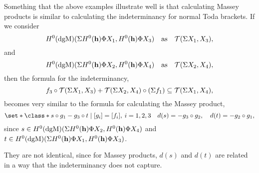 Something that the above examples illustrate well is that calculating Massey products is similar to calculating the indeterminancy for normal Toda brackets. If we consider
\[
    H^0(\operatorname{dgM})(\Sigma H^0(\mathbf{h}) \Phi X_1, H^0(\mathbf{h}) \Phi X_3) \quad \text{as} \quad {\mathcal{T}}(\Sigma X_1, X_3),
\]
and
\[
    H^0(\operatorname{dgM})(\Sigma H^0(\mathbf{h}) \Phi X_2, H^0(\mathbf{h}) \Phi X_4) \quad \text{as} \quad {\mathcal{T}}(\Sigma X_2, X_4),
\]
then the formula for the indeterminancy,
\[
    f_3 \circ {\mathcal{T}}(\Sigma X_1, X_3)  + {\mathcal{T}}(\Sigma X_2, X_4) \circ (\Sigma f_1) \subseteq {\mathcal{T}}(\Sigma X_1, X_4),
\]
becomes very similar to the formula for calculating the Massey product,
\[
    \set*{
        \class*{
            s \circ g_1 - g_3 \circ t
        }
        \mid [g_i] = [f_i], \: i = 1, 2, 3 \quad
        d(s) = - g_3 \circ g_2, \quad
        d(t) = - g_2 \circ g_1
    },
\]
since \( s \in H^0(\operatorname{dgM})(\Sigma H^0(\mathbf{h}) \Phi X_2, H^0(\mathbf{h}) \Phi X_4) \) and \( t \in H^0(\operatorname{dgM})(\Sigma H^0(\mathbf{h}) \Phi X_1, H^0(\mathbf{h}) \Phi X_3) \).

They are not identical, since for Massey products, \( d(s) \) and \( d(t) \) are related in a way that the indeterminancy does not capture.